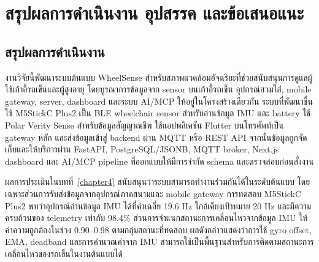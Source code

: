 \chapter{สรุปผลการดำเนินงาน อุปสรรค และข้อเสนอแนะ}
\label{chapter5}

\section{สรุปผลการดำเนินงาน}
\label{sec:ch5_system_summary}

งานวิจัยนี้พัฒนาระบบต้นแบบ WheelSense สำหรับสภาพแวดล้อมอัจฉริยะที่ช่วยสนับสนุนการดูแลผู้ใช้เก้าอี้รถเข็นและผู้สูงอายุ โดยบูรณาการข้อมูลจาก sensor บนเก้าอี้รถเข็น อุปกรณ์สวมใส่, mobile gateway, server, dashboard และระบบ AI/MCP ให้อยู่ในโครงสร้างเดียวกัน ระบบที่พัฒนาขึ้นใช้ M5StickC Plus2 เป็น BLE wheelchair sensor สำหรับอ่านข้อมูล IMU และ battery ใช้ Polar Verity Sense สำหรับข้อมูลสัญญาณชีพ ใช้แอปพลิเคชัน Flutter บนโทรศัพท์เป็น gateway หลัก และส่งข้อมูลเข้าสู่ backend ผ่าน MQTT หรือ REST API จากนั้นข้อมูลถูกจัดเก็บและให้บริการผ่าน FastAPI, PostgreSQL/JSONB, MQTT broker, Next.js dashboard และ AI/MCP pipeline ที่ออกแบบให้มีการจำกัด schema และตรวจสอบก่อนสั่งงาน

ผลการประเมินในบทที่~\ref{chapter4} สนับสนุนว่าระบบสามารถทำงานร่วมกันได้ในระดับต้นแบบ โดยเฉพาะส่วนการรับส่งข้อมูลจากอุปกรณ์ภาคสนามและ mobile gateway การทดสอบ M5StickC Plus2 พบว่าอุปกรณ์อ่านข้อมูล IMU ได้ที่ค่าเฉลี่ย 19.6 Hz ใกล้เคียงเป้าหมาย 20 Hz และมีความครบถ้วนของ telemetry เท่ากับ 98.4\% ส่วนการจำแนกสถานะการเคลื่อนไหวจากข้อมูล IMU ให้ค่าความถูกต้องในช่วง 0.90--0.98 ตามกลุ่มสถานะที่ทดสอบ ผลดังกล่าวแสดงว่าการใช้ gyro offset, EMA, deadband และการคำนวณค่าจาก IMU สามารถใช้เป็นพื้นฐานสำหรับการติดตามสถานะการเคลื่อนไหวของรถเข็นในงานต้นแบบได้

